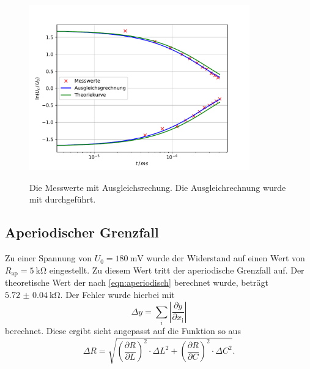 \begin{figure}
\centering
\caption{Die Messwerte mit Ausgleichsrechung. Die Ausgleichrechnung wurde mit \cite{matplotlib} durchgeführt.}
\includegraphics[width=0.85\textwidth]{content/data/plota.pdf}
\label{fig:ausgleich}
\end{figure}

\subsection{Aperiodischer Grenzfall}
Zu einer Spannung von $U_0 = \SI{180}{\milli\V}$ wurde der Widerstand auf einen Wert von $R_\text{ap} = \SI{5}{\kilo\ohm}$ eingestellt.
Zu diesem Wert tritt der aperiodische Grenzfall auf. Der theoretische Wert der nach \eqref{eqn:aperiodisch} berechnet wurde, beträgt $\SI{5.72(4)}{\kilo\ohm}$.
Der Fehler wurde hierbei mit 
\begin{equation}
    \Delta y = \sum_i \left | \frac{\partial y}{\partial x_\text{i}} \right |
    \label{eqn:fehler}
\end{equation}
berechnet.
Diese ergibt sieht angepasst auf die Funktion so aus
\begin{equation}
    \Delta R = \sqrt{\left (\frac{\partial R}{\partial L} \right )^2 \cdot \Delta L^2 +  \left ( \frac{\partial R}{\partial C} \right )^2 \cdot \Delta C^2}  .
\end{equation}
